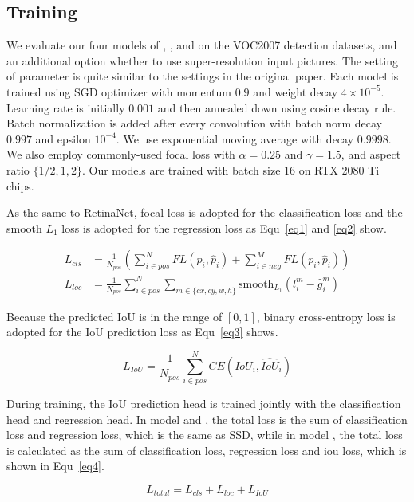 \documentclass[journal,conference]{IEEEtran}
\begin{document}
\subsection{Training}
We evaluate our four models of , , and  on the VOC2007 detection datasets, and an additional option whether to use super-resolution input pictures. The setting of parameter is quite similar to the settings in the original paper. Each model is trained using SGD optimizer with momentum $0.9$ and weight decay $4\times 10^{-5}$.  Learning rate is initially $0.001$ and then annealed down using cosine decay rule. Batch normalization is added after every convolution with batch norm decay $0.997$ and epsilon $10^{-4}$. We use exponential moving average with decay $0.9998$. We also employ commonly-used focal loss with $\alpha = 0.25$ and $\gamma= 1.5$, and aspect ratio $\{1/2, 1, 2\}$. Our models are trained with batch size $16$ on RTX 2080 Ti chips.

As the same to RetinaNet, focal loss is adopted for the classification loss and the smooth $L_1$ loss is adopted for the regression loss as Equ~\eqref{eq1} and \eqref{eq2} show.

\begin{align}
  L_{cls} & =\frac{1}{N_{pos}}\left(\sum_{i\in pos}^N FL(p_i,\hat{p}_i)+\sum_{i\in neg}^M FL(p_i,\hat{p}_i)\right)\label{eq1} \\
  L_{loc} & =\frac{1}{N_{pos}}\sum_{i\in pos}^N \sum_{m\in \{cx,cy,w,h\}} \text{smooth}_{L_1}(l_i^m-\hat{g}_i^m)\label{eq2}
\end{align}

Because the predicted IoU is in the range of $[0,1]$, binary cross-entropy loss is adopted for the IoU prediction loss as Equ~\eqref{eq3} shows.

\begin{equation}
  L_{IoU}=\frac{1}{N_{pos}}\sum_{i\in pos}^N CE(IoU_i,\hat{IoU}_i)\label{eq3}
\end{equation}

During training, the IoU prediction head is trained jointly with the classification head and regression head. In model  and , the total loss is the sum of classification loss and regression loss, which is the same as SSD, while in model , the total loss is calculated as the sum of classification loss, regression loss and iou loss, which is shown in Equ~\eqref{eq4}.

\begin{equation}
  L_{total}=L_{cls}+L_{loc}+L_{IoU}\label{eq4}
\end{equation}
\end{document}
